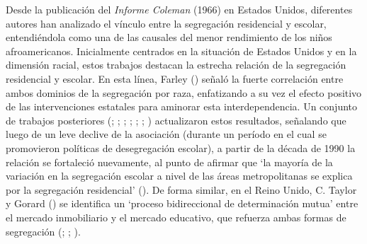 \documentclass[
  spanish,
  a4paper,%
  chapterprefix=true,%
  DIV=calc,%
  twoside]{scrbook}%
\begin{document}
Desde la publicación del \emph{Informe Coleman} (1966) en Estados Unidos,
diferentes autores han analizado el vínculo entre la segregación
residencial y escolar, entendiéndola como una de las causales del menor
rendimiento de los niños afroamericanos.
Inicialmente centrados en la
situación de Estados Unidos y en la dimensión racial, estos trabajos
destacan la estrecha relación de la segregación residencial y escolar.
En esta línea, Farley () señaló la fuerte correlación entre ambos
dominios de la segregación por raza, enfatizando a su vez el efecto
positivo de las intervenciones estatales para aminorar esta
interdependencia. Un conjunto de trabajos posteriores (; ; ; ; ; ; ) actualizaron estos resultados, señalando
que luego de un leve declive de la asociación (durante un período en el
cual se promovieron políticas de desegregación escolar), a partir de la
década de 1990 la relación se fortaleció nuevamente, al punto de afirmar
que `la mayoría de la variación en la segregación escolar a nivel de las
áreas metropolitanas se explica por la segregación residencial'
(). De forma similar, en el Reino Unido,
C. Taylor y Gorard () se identifica un `proceso bidireccional de
determinación mutua' entre el mercado inmobiliario y el mercado
educativo, que refuerza ambas formas de segregación (; ; ).
\end{document}
